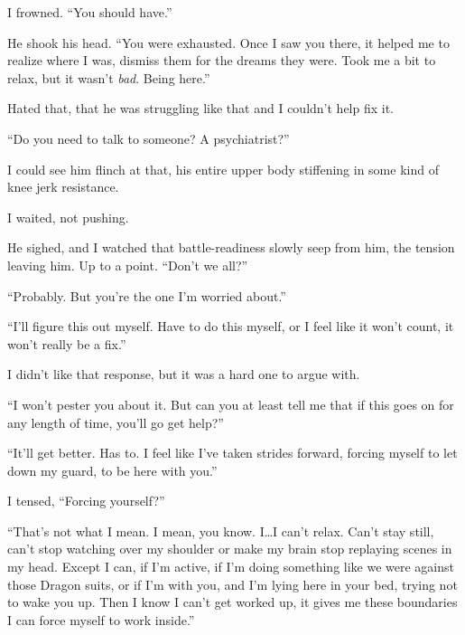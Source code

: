 I frowned.  ``You should have.''



He shook his head.  ``You were exhausted.  Once I saw you there, it helped me to realize where I was, dismiss them for the dreams they were.  Took me a bit to relax, but it wasn't \emph{bad}.  Being here.''



Hated that, that he was struggling like that and I couldn't help fix it.



``Do you need to talk to someone?  A psychiatrist?''



I could see him flinch at that, his entire upper body stiffening in some kind of knee jerk resistance.



I waited, not pushing.



He sighed, and I watched that battle-readiness slowly seep from him, the tension leaving him.  Up to a point.  ``Don't we all?''



``Probably.  But you're the one I'm worried about.''



``I'll figure this out myself.  Have to do this myself, or I feel like it won't count, it won't really be a fix.''



I didn't like that response, but it was a hard one to argue with.



``I won't pester you about it.  But can you at least tell me that if this goes on for any length of time, you'll go get help?''



``It'll get better.  Has to.  I feel like I've taken strides forward, forcing myself to let down my guard, to be here with you.''



I tensed, ``Forcing yourself?''



``That's not what I mean.  I mean, you know.  I\ldots I can't relax.  Can't stay still, can't stop watching over my shoulder or make my brain stop replaying scenes in my head.  Except I can, if I'm active, if I'm doing something like we were against those Dragon suits, or if I'm with you, and I'm lying here in your bed, trying not to wake you up.  Then I know I can't get worked up, it gives me these boundaries I can force myself to work inside.''



